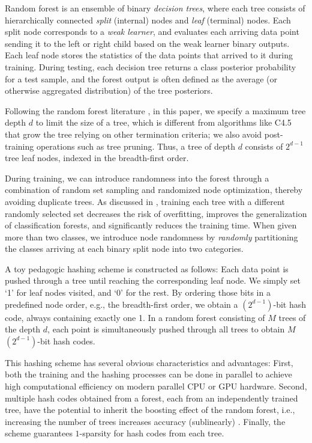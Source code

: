 \documentclass[runningheads]{llncs}
\begin{document}
{Random forest} \cite{RF2001, RFBook} is an ensemble of binary \emph{decision
  trees}, where each tree consists of hierarchically connected \emph{split}
(internal) nodes and \emph{leaf} (terminal) nodes.  Each split node corresponds
to a \emph{weak learner}, and evaluates each arriving data point sending it to
the left or right child based on the weak learner binary outputs.  Each leaf
node stores the statistics of the data points that arrived to it during
training.  During testing, each decision tree returns a class posterior
probability for a test sample, and the forest output is often defined as the
average (or otherwise aggregated distribution) of the tree posteriors.

Following the random forest literature \cite{RFBook}, in this paper, we specify
a maximum tree depth $d$ to limit the size of a tree, which is different from
algorithms like C4.5 \cite{c4.5} that grow the tree relying on other termination
criteria; we also avoid post-training operations such as tree pruning. Thus, a
tree of depth $d$ consists of $2^{d-1}$ tree leaf nodes, indexed in the
breadth-first order.

During training, we can introduce randomness into the forest through a
combination of random set sampling and randomized node optimization, thereby
avoiding duplicate trees.  As discussed in \cite{RF2001, RFBook}, training each
tree with a different randomly selected set decreases the risk of overfitting,
improves the generalization of classification forests, and significantly reduces
the training time. When given more than two classes, we introduce node
randomness by \emph{randomly} partitioning the classes arriving at each binary
split node into two categories.

A toy pedagogic hashing scheme is constructed as follows: Each data point is
pushed through a tree until reaching the corresponding leaf node. We simply set
`1' for leaf nodes visited, and `0' for the rest.  By ordering those bits in a
predefined node order, e.g., the breadth-first order, we obtain a
$(2^{d-1})$-bit hash code, always containing exactly one 1.  In a random forest
consisting of $M$ trees of the depth $d$, each point is simultaneously pushed
through all trees to obtain $M$ $(2^{d-1})$-bit hash codes.

This hashing scheme has several obvious characteristics and advantages: First,
both the training and the hashing processes can be done in parallel to achieve
high computational efficiency on modern parallel CPU or GPU hardware.  Second,
multiple hash codes obtained from a forest, each from an independently trained
tree, have the potential to inherit the boosting effect of the random forest,
i.e., increasing the number of trees increases accuracy (sublinearly)
\cite{RFBook}.  Finally, the scheme guarantees $1$-sparsity for hash codes from
each tree.
\end{document}
